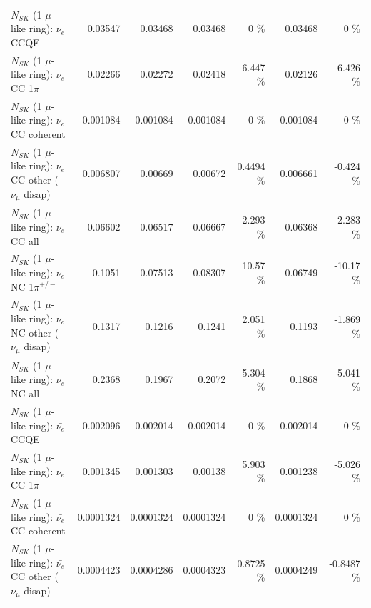 \begin{table}
\begin{tabular}{| l | r | r | r  r | r  r |}
\hline
\hline
\hline
                                      $N_{SK}$ (1 $\mu$-like ring): $\nu_e$ CCQE &         0.03547 &         0.03468 &         0.03468 &        0 \%  &         0.03468 &        0 \%  \\ 
                                 $N_{SK}$ (1 $\mu$-like ring): $\nu_e$ CC 1$\pi$ &         0.02266 &         0.02272 &         0.02418 &    6.447 \%  &         0.02126 &   -6.426 \%  \\ 
                               $N_{SK}$ (1 $\mu$-like ring): $\nu_e$ CC coherent &        0.001084 &        0.001084 &        0.001084 &        0 \%  &        0.001084 &        0 \%  \\ 
                $N_{SK}$ (1 $\mu$-like ring): $\nu_e$ CC other ($\nu_\mu$ disap) &        0.006807 &         0.00669 &         0.00672 &   0.4494 \%  &        0.006661 &   -0.424 \%  \\ 
                                  $N_{SK}$ (1 $\mu$-like ring): $\nu_{e}$ CC all &         0.06602 &         0.06517 &         0.06667 &    2.293 \%  &         0.06368 &   -2.283 \%  \\ 
\hline
                           $N_{SK}$ (1 $\mu$-like ring): $\nu_e$ NC 1$\pi^{+/-}$ &          0.1051 &         0.07513 &         0.08307 &    10.57 \%  &         0.06749 &   -10.17 \%  \\ 
                $N_{SK}$ (1 $\mu$-like ring): $\nu_e$ NC other ($\nu_\mu$ disap) &          0.1317 &          0.1216 &          0.1241 &    2.051 \%  &          0.1193 &   -1.869 \%  \\ 
                                  $N_{SK}$ (1 $\mu$-like ring): $\nu_{e}$ NC all &          0.2368 &          0.1967 &          0.2072 &    5.304 \%  &          0.1868 &   -5.041 \%  \\ 
\hline
\hline
\hline
                                $N_{SK}$ (1 $\mu$-like ring): $\bar{\nu_e}$ CCQE &        0.002096 &        0.002014 &        0.002014 &        0 \%  &        0.002014 &        0 \%  \\ 
                           $N_{SK}$ (1 $\mu$-like ring): $\bar{\nu_e}$ CC 1$\pi$ &        0.001345 &        0.001303 &         0.00138 &    5.903 \%  &        0.001238 &   -5.026 \%  \\ 
                         $N_{SK}$ (1 $\mu$-like ring): $\bar{\nu_e}$ CC coherent &       0.0001324 &       0.0001324 &       0.0001324 &        0 \%  &       0.0001324 &        0 \%  \\ 
          $N_{SK}$ (1 $\mu$-like ring): $\bar{\nu_e}$ CC other ($\nu_\mu$ disap) &       0.0004423 &       0.0004286 &       0.0004323 &   0.8725 \%  &       0.0004249 &  -0.8487 \%  \\ 

\end{tabular}
\end{table}
